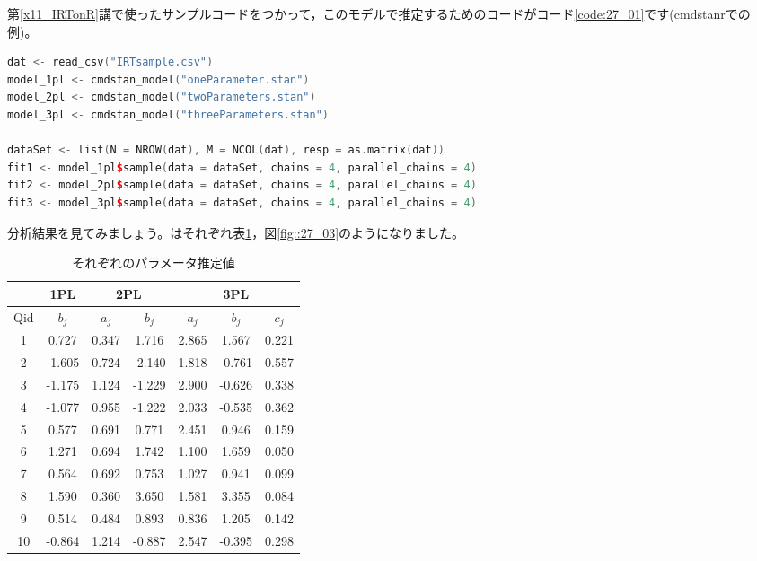 \documentclass{ltjsbook}
\begin{document}
第\ref{x11_IRTonR}講で使ったサンプルコードをつかって，このモデルで推定するためのコードがコード\ref{code:27_01}です(cmdstanrでの例)。
\begin{lstlisting}[language=c++,label={code:27_01},caption={IRTのコード}]
dat <- read_csv("IRTsample.csv")
model_1pl <- cmdstan_model("oneParameter.stan")
model_2pl <- cmdstan_model("twoParameters.stan")
model_3pl <- cmdstan_model("threeParameters.stan")

dataSet <- list(N = NROW(dat), M = NCOL(dat), resp = as.matrix(dat))
fit1 <- model_1pl$sample(data = dataSet, chains = 4, parallel_chains = 4)
fit2 <- model_2pl$sample(data = dataSet, chains = 4, parallel_chains = 4)
fit3 <- model_3pl$sample(data = dataSet, chains = 4, parallel_chains = 4)
\end{lstlisting}
分析結果を見てみましょう。はそれぞれ表\ref{tbl::27_01}，図\ref{fig::27_03}のようになりました。
\begin{table}[ht]
	\caption{それぞれのパラメータ推定値}
	\centering
	\begin{tabular}[t]{c|c|cc|ccc}
		\multicolumn{1}{c|}{} & \multicolumn{1}{c|}{1PL} & \multicolumn{2}{c|}{2PL} & \multicolumn{3}{c}{3PL}                          \\\hline
		Qid                   & $b_j$                    & $a_j$                    & $b_j$                   & $a_j$ & $b_j$  & $c_j$ \\
		\hline
		1                     & 0.727                    & 0.347                    & 1.716                   & 2.865 & 1.567  & 0.221 \\
		2                     & -1.605                   & 0.724                    & -2.140                  & 1.818 & -0.761 & 0.557 \\
		3                     & -1.175                   & 1.124                    & -1.229                  & 2.900 & -0.626 & 0.338 \\
		4                     & -1.077                   & 0.955                    & -1.222                  & 2.033 & -0.535 & 0.362 \\
		5                     & 0.577                    & 0.691                    & 0.771                   & 2.451 & 0.946  & 0.159 \\
		6                     & 1.271                    & 0.694                    & 1.742                   & 1.100 & 1.659  & 0.050 \\
		7                     & 0.564                    & 0.692                    & 0.753                   & 1.027 & 0.941  & 0.099 \\
		8                     & 1.590                    & 0.360                    & 3.650                   & 1.581 & 3.355  & 0.084 \\
		9                     & 0.514                    & 0.484                    & 0.893                   & 0.836 & 1.205  & 0.142 \\
		10                    & -0.864                   & 1.214                    & -0.887                  & 2.547 & -0.395 & 0.298 \\
		\hline
	\end{tabular}
	\label{tbl::27_01}
\end{table}
\end{document}
